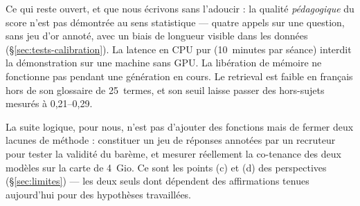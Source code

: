 Ce qui reste ouvert, et que nous écrivons sans l'adoucir : la qualité \emph{pédagogique} du score n'est pas démontrée au sens statistique --- quatre
appels sur une question, sans jeu d'or annoté, avec un biais de longueur visible
dans les données (§\ref{sec:tests-calibration}). La latence en CPU pur (10~minutes
par séance) interdit la démonstration sur une machine sans GPU. La libération de
mémoire ne fonctionne pas pendant une génération en cours. Le retrieval est
faible en français hors de son glossaire de 25~termes, et son seuil laisse passer
des hors-sujets mesurés à 0,21--0,29.

La suite logique, pour nous, n'est pas d'ajouter des fonctions mais de fermer
deux lacunes de méthode : constituer un jeu de réponses annotées par un recruteur
pour tester la validité du barème, et mesurer réellement la co-tenance des deux
modèles sur la carte de 4~Gio. Ce sont les points (c) et (d) des
perspectives (§\ref{sec:limites}) --- les deux seuls dont dépendent des
affirmations tenues aujourd'hui pour des hypothèses travaillées.
